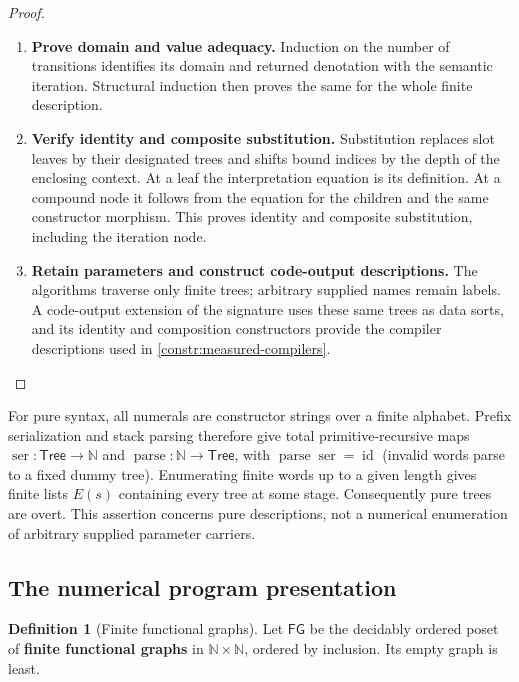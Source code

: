 \documentclass[11pt,a4paper]{article}
\numberwithin{algorithm}{section}
\numberwithin{equation}{section}
\theoremstyle{definition}
\newtheorem{definition}[definition]{Definition}
\theoremstyle{remark}
\theoremstyle{plain}
\newcommand{\N}{\mathbb N}
\newcommand{\id}{\operatorname{id}}
\theoremstyle{definition}
\theoremstyle{plain}
\begin{document}
\begin{proof}
\begin{enumerate}[leftmargin=*,align=left]
\item \textbf{Prove domain and value adequacy.}
Induction on
the number of transitions identifies its domain and returned
denotation with the semantic iteration. Structural induction
then proves the same for the whole finite description.

\item \textbf{Verify identity and composite substitution.}
Substitution replaces slot leaves by their designated trees and
shifts bound indices by the depth of the enclosing context.
At a leaf the interpretation equation is its definition.
At a compound node it follows from the equation for the children
and the same constructor morphism. This proves identity and
composite substitution, including the iteration node.

\item \textbf{Retain parameters and construct code-output descriptions.}
The algorithms traverse only finite trees; arbitrary supplied
names remain labels. A code-output extension of the signature
uses these same trees as data sorts, and its identity and
composition constructors provide the compiler descriptions
used in \cref{constr:measured-compilers}.
\end{enumerate}
\end{proof}

For pure syntax, all numerals are constructor strings
over a finite alphabet. Prefix serialization and stack parsing
therefore give total primitive-recursive maps
$\operatorname{ser}:\mathsf{Tree}\to\N$ and
$\operatorname{parse}:\N\to\mathsf{Tree}$, with
$\operatorname{parse}\operatorname{ser}=\id$ (invalid words parse
to a fixed dummy tree). Enumerating finite words up to a given
length gives finite lists $E(s)$ containing every tree at some
stage. Consequently pure trees are overt.
This assertion concerns pure descriptions, not a numerical
enumeration of arbitrary supplied parameter carriers.

\subsection{The numerical program presentation}


\begin{definition}[Finite functional graphs]\label{def:finite-functional-graphs}
Let $\mathsf{FG}$ be the decidably ordered poset of \textbf{finite functional graphs} in $\N\times\N$, ordered by inclusion. Its empty graph is
least.
\end{definition}
\end{document}
